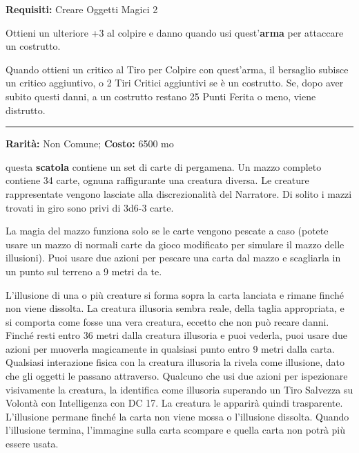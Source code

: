 \begin{multicols}{2}
\textbf{Requisiti:} Creare Oggetti Magici 2

Ottieni un ulteriore +3 al colpire e danno quando usi quest'\textbf{arma} per attaccare un costrutto.

Quando ottieni un critico al Tiro per Colpire con quest'arma, il bersaglio subisce un critico aggiuntivo, o 2 Tiri Critici aggiuntivi se è un costrutto. Se, dopo aver subito questi danni, a un costrutto restano 25 Punti Ferita o meno, viene distrutto.

\smallskip\noindent\rule{\linewidth}{2pt}  \hypertarget{MazzodelleIllusioni}{}\medskip{}\noindent\label{MazzodelleIllusioni}

\textbf{Rarità:} Non Comune; \textbf{Costo:} 6500 mo

questa \textbf{scatola} contiene un set di carte di pergamena. Un mazzo completo contiene 34 carte, ognuna raffigurante una creatura diversa. Le creature rappresentate vengono lasciate alla discrezionalità del Narratore. Di solito i mazzi trovati in giro sono privi di 3d6-3 carte.

La magia del mazzo funziona solo se le carte vengono pescate a caso (potete usare un mazzo di normali carte da gioco modificato per simulare il mazzo delle illusioni). Puoi usare due azioni per pescare una carta dal mazzo e scagliarla in un punto sul terreno a 9 metri da te.

L'illusione di una o più creature si forma sopra la carta lanciata e rimane finché non viene dissolta. La creatura illusoria sembra reale, della taglia appropriata, e si comporta come fosse una vera creatura, eccetto che non può recare danni. Finché resti entro 36 metri dalla creatura illusoria e puoi vederla, puoi usare due azioni per muoverla magicamente in qualsiasi punto entro 9 metri dalla carta. Qualsiasi interazione fisica con la creatura illusoria la rivela come illusione, dato che gli oggetti le passano attraverso. Qualcuno che usi due azioni per ispezionare visivamente la creatura, la identifica come illusoria superando un Tiro Salvezza su Volontà con Intelligenza con DC 17. La creatura le apparirà quindi trasparente.
L'illusione permane finché la carta non viene mossa o l'illusione dissolta. Quando l'illusione termina, l'immagine sulla carta scompare e quella carta non potrà più essere usata.

\medskip


\end{multicols}
